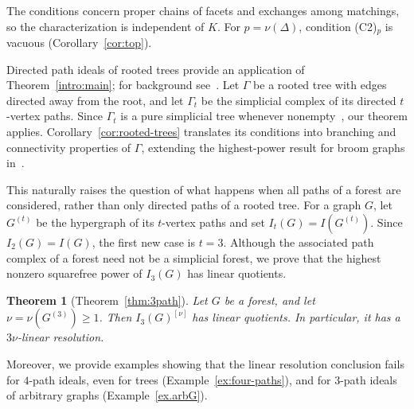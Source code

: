 \documentclass{amsart}
\newtheorem{IntroTheorem}{Theorem}
\theoremstyle{definition}
\theoremstyle{remark}
\begin{document}
The conditions concern proper chains of facets and exchanges among
matchings, so the characterization is independent of $K$.
For $p=\nu(\Delta)$, condition (C2)$_p$ is vacuous
(Corollary~\ref{cor:top}).



Directed path ideals of rooted trees provide an application of
Theorem~\ref{intro:main};  for background see~\cite{ConcaDeNegri,JV}.
Let $\Gamma$ be a rooted tree with edges directed away from the
root, and let $\Gamma_t$ be the simplicial complex of its directed
$t$-vertex paths. Since $\Gamma_t$ is a pure simplicial tree
whenever nonempty~\cite[Theorem~2.7]{JV}, our theorem applies.
Corollary~\ref{cor:rooted-trees} translates its conditions into
branching and connectivity properties of $\Gamma$, extending the
highest-power result for broom graphs
in~\cite[Theorem~2.7]{KNQ24squarefree}.

This naturally raises the question of what happens when all
paths of a forest are considered, rather than only directed
paths of a rooted tree. For a graph $G$, let $G^{(t)}$ be the
hypergraph of its $t$-vertex paths and set
$I_t(G)=I(G^{(t)})$. Since $I_2(G)=I(G)$, the first new case
is $t=3$. Although the associated path complex of a forest
need not be a simplicial forest, we prove that the highest
nonzero squarefree power of $I_3(G)$ has linear quotients.


\begin{IntroTheorem}[Theorem~\ref{thm:3path}]\label{intro:3path}
Let $G$ be a forest, and let $\nu=\nu(G^{(3)})\geq1$.
Then $I_3(G)^{[\nu]}$ has linear quotients. In particular, it has a
$3\nu$-linear resolution.
\end{IntroTheorem}


Moreover, we provide examples showing that the linear resolution conclusion fails for $4$-path ideals, even for trees (Example~\ref{ex:four-paths}), and for $3$-path ideals of arbitrary graphs (Example~\ref{ex.arbG}).
\end{document}
